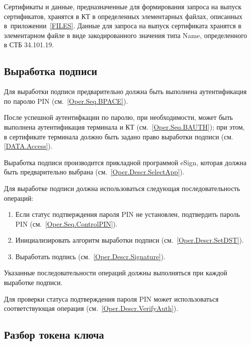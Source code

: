 
Сертификаты и данные, предназначенные для формирования запроса
на выпуск сертификатов, хранятся в КТ в определенных элементарных файлах, 
описанных в~приложении~\ref{FILES}.
Данные для запроса на выпуск сертификата 
хранятся в элементарном файле в виде закодированного
значения типа Name, определенного в СТБ 34.101.19.

\subsection{Выработка подписи}
\label{Oper.Seq.Sig}

Для выработки подписи предварительно 
должна быть выполнена аутентификация по 
паролю PIN  (см.~\ref{Oper.Seq.BPACE}).

После успешной аутентифкации по паролю,
при необходимости, может быть выполнена 
аутентификация терминала и КТ (см.~\ref{Oper.Seq.BAUTH});
при этом, в сертификате терминала должно быть задано право
выработки подписи (см. \ref{DATA.Access}).

Выработка подписи производится прикладной программой eSign, которая
должна быть предварительно выбрана (см.~\ref{Oper.Descr.SelectApp}).

Для выработке подписи  должна использоваться 
следующая последовательность операций:
%
\begin{enumerate}
\item Если статус подтверждения пароля PIN не установлен,
      подтвердить пароль PIN (см.~\ref{Oper.Seq.ControlPIN}).
\item Инициализировать алгоритм выработки подписи (см.~\ref{Oper.Descr.SetDST}).
\item Выработать подпись (см.~\ref{Oper.Descr.Signature}).
\end{enumerate}
%
Указанные последовательности операций должны выполняться
при каждой выработке подписи.

Для проверки статуса подтверждения пароля PIN может использоваться 
соответствующая операция (см.~\ref{Oper.Descr.VerifyAuth}).

\subsection{Разбор токена ключа}
\label{Oper.Seq.Decipher}

